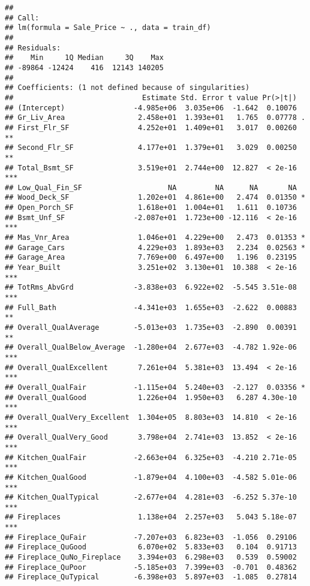 \documentclass[
]{article}
\begin{document}
\begin{verbatim}
## 
## Call:
## lm(formula = Sale_Price ~ ., data = train_df)
## 
## Residuals:
##    Min     1Q Median     3Q    Max 
## -89864 -12424    416  12143 140205 
## 
## Coefficients: (1 not defined because of singularities)
##                              Estimate Std. Error t value Pr(>|t|)    
## (Intercept)                -4.985e+06  3.035e+06  -1.642  0.10076    
## Gr_Liv_Area                 2.458e+01  1.393e+01   1.765  0.07778 .  
## First_Flr_SF                4.252e+01  1.409e+01   3.017  0.00260 ** 
## Second_Flr_SF               4.177e+01  1.379e+01   3.029  0.00250 ** 
## Total_Bsmt_SF               3.519e+01  2.744e+00  12.827  < 2e-16 ***
## Low_Qual_Fin_SF                    NA         NA      NA       NA    
## Wood_Deck_SF                1.202e+01  4.861e+00   2.474  0.01350 *  
## Open_Porch_SF               1.618e+01  1.004e+01   1.611  0.10736    
## Bsmt_Unf_SF                -2.087e+01  1.723e+00 -12.116  < 2e-16 ***
## Mas_Vnr_Area                1.046e+01  4.229e+00   2.473  0.01353 *  
## Garage_Cars                 4.229e+03  1.893e+03   2.234  0.02563 *  
## Garage_Area                 7.769e+00  6.497e+00   1.196  0.23195    
## Year_Built                  3.251e+02  3.130e+01  10.388  < 2e-16 ***
## TotRms_AbvGrd              -3.838e+03  6.922e+02  -5.545 3.51e-08 ***
## Full_Bath                  -4.341e+03  1.655e+03  -2.622  0.00883 ** 
## Overall_QualAverage        -5.013e+03  1.735e+03  -2.890  0.00391 ** 
## Overall_QualBelow_Average  -1.280e+04  2.677e+03  -4.782 1.92e-06 ***
## Overall_QualExcellent       7.261e+04  5.381e+03  13.494  < 2e-16 ***
## Overall_QualFair           -1.115e+04  5.240e+03  -2.127  0.03356 *  
## Overall_QualGood            1.226e+04  1.950e+03   6.287 4.30e-10 ***
## Overall_QualVery_Excellent  1.304e+05  8.803e+03  14.810  < 2e-16 ***
## Overall_QualVery_Good       3.798e+04  2.741e+03  13.852  < 2e-16 ***
## Kitchen_QualFair           -2.663e+04  6.325e+03  -4.210 2.71e-05 ***
## Kitchen_QualGood           -1.879e+04  4.100e+03  -4.582 5.01e-06 ***
## Kitchen_QualTypical        -2.677e+04  4.281e+03  -6.252 5.37e-10 ***
## Fireplaces                  1.138e+04  2.257e+03   5.043 5.18e-07 ***
## Fireplace_QuFair           -7.207e+03  6.823e+03  -1.056  0.29106    
## Fireplace_QuGood            6.070e+02  5.833e+03   0.104  0.91713    
## Fireplace_QuNo_Fireplace    3.394e+03  6.298e+03   0.539  0.59002    
## Fireplace_QuPoor           -5.185e+03  7.399e+03  -0.701  0.48362    
## Fireplace_QuTypical        -6.398e+03  5.897e+03  -1.085  0.27814    

\end{verbatim}
\end{document}
